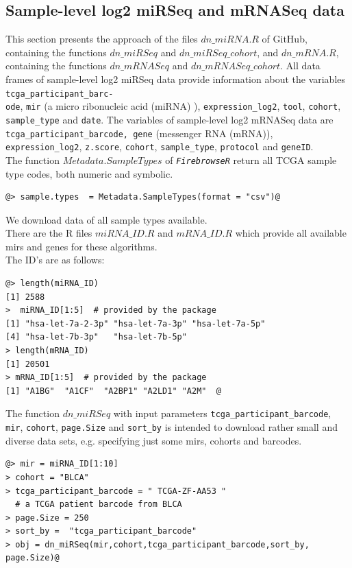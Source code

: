 \documentclass[a4paper,12pt,listof=totoc,bibliography=totoc]{scrartcl}
\begin{document}
\subsection{Sample-level log2 miRSeq and mRNASeq data}
This section presents the approach of the files $dn\_miRNA.R$ of GitHub, containing the functions $dn\_miRSeq$ and $dn\_miRSeq\_cohort$, and $dn\_mRNA.R$, 
containing the functions $dn\_mRNASeq$ and $dn\_mRNASeq\_cohort$. All data frames of sample-level log2 miRSeq data provide information about the 
variables {\tt tcga\_participant\_barc-\\ ode}, {\tt mir} (a micro ribonucleic acid (miRNA) ), {\tt expression\_log2}, {\tt tool}, {\tt cohort}, {\tt sample\_type} and {\tt date}. The variables of sample-level log2 
mRNASeq data are {\tt tcga\_participant\_barcode, gene} (messenger RNA (mRNA)), {\tt expression\_log2}, {\tt z.score}, {\tt cohort}, {\tt sample\_type}, 
{\tt protocol} and {\tt geneID}.\\
The function $Metadata.SampleTypes$ of \texttt{\em FirebrowseR} return all TCGA sample type codes, both numeric and symbolic.
\begin{lstlisting}[style=base]
@> sample.types  = Metadata.SampleTypes(format = "csv")@
 \end{lstlisting}
We download data of all sample types available.\\
There are the R files $miRNA\_ID.R$ and $mRNA\_ID.R$ which provide all available mirs and genes for these algorithms.\\
The ID's are as follows:
\begin{lstlisting}[style=base]
@> length(miRNA_ID)
[1] 2588
>  miRNA_ID[1:5]  # provided by the package
[1] "hsa-let-7a-2-3p" "hsa-let-7a-3p" "hsa-let-7a-5p" 
[4] "hsa-let-7b-3p"   "hsa-let-7b-5p"         
> length(mRNA_ID)
[1] 20501
> mRNA_ID[1:5]  # provided by the package
[1] "A1BG"  "A1CF"  "A2BP1" "A2LD1" "A2M"  @
\end{lstlisting}
The function $dn\_miRSeq$ with input parameters  {\tt tcga\_participant\_barcode}, {\tt mir}, {\tt cohort}, {\tt page.Size} and {\tt sort\_by} is intended to download 
rather small and diverse data sets, e.g. specifying just some mirs, cohorts and barcodes.
\begin{lstlisting}[style=base]
@> mir = miRNA_ID[1:10]
> cohort = "BLCA"
> tcga_participant_barcode = " TCGA-ZF-AA53 "  
  # a TCGA patient barcode from BLCA
> page.Size = 250 
> sort_by =  "tcga_participant_barcode"
> obj = dn_miRSeq(mir,cohort,tcga_participant_barcode,sort_by, 
page.Size)@
\end{lstlisting}
\end{document}
